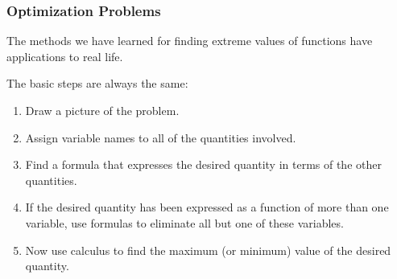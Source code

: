 \begin{frame}
\frametitle{Optimization Problems}
The methods we have learned for finding extreme values of functions have applications to real life.  

The basic steps are always the same:
\begin{enumerate}
\item  Draw a picture of the problem.
\item  Assign variable names to all of the quantities involved.
\item  Find a formula that expresses the desired quantity in terms of the other quantities.
\item  If the desired quantity has been expressed as a function of more than one variable, use formulas to eliminate all but one of these variables.
\item  Now use calculus to find the maximum (or minimum) value of the desired quantity.
\end{enumerate}
\end{frame}
